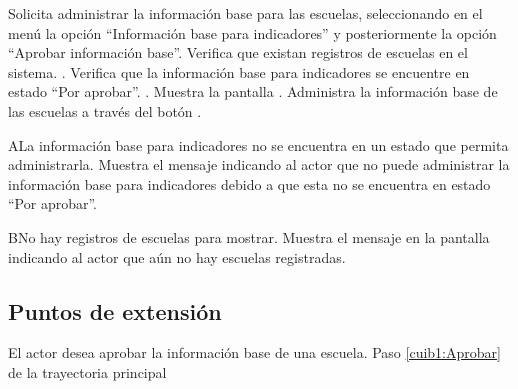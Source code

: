  \begin{UCtrayectoria}
    \UCpaso[\UCactor] Solicita administrar la información base para las escuelas, seleccionando en el menú  la opción ``Información base para indicadores'' y posteriormente la opción ``Aprobar información base''. 
    \UCpaso[\UCsist] Verifica que existan registros de escuelas en el sistema. .
    \UCpaso[\UCsist] Verifica que la  información base para indicadores se encuentre en estado ``Por aprobar''. .
    \UCpaso[\UCsist] Muestra la pantalla .
    \UCpaso[\UCactor] Administra la información base de las escuelas a través del botón \botOk. \label{cuib1:Aprobar}
 \end{UCtrayectoria}
 
   \begin{UCtrayectoriaA}{A}{La información base para indicadores no se encuentra en un estado que permita administrarla.}
    \UCpaso[\UCsist] Muestra el mensaje  indicando al actor que no puede administrar la información base para indicadores debido a que esta no se encuentra en estado ``Por aprobar''. 
 \end{UCtrayectoriaA}
 
   \begin{UCtrayectoriaA}{B}{No hay registros de escuelas para mostrar.}
    \UCpaso[\UCsist] Muestra el mensaje  en la pantalla  indicando al actor que aún no hay escuelas registradas. 
 \end{UCtrayectoriaA}
 
\subsection{Puntos de extensión}

\UCExtensionPoint
{El actor desea aprobar la información base de una escuela.}
{ Paso \ref{cuib1:Aprobar} de la trayectoria principal}
{}
